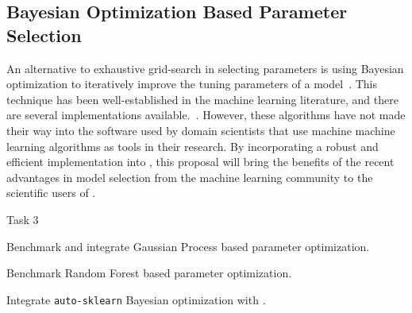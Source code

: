 \subsection{Bayesian Optimization Based Parameter Selection}
An alternative to exhaustive grid-search in selecting parameters is using
Bayesian optimization to iteratively improve the tuning parameters of a
model~\autocite{NIPS2011_4443, shahriari2016taking, NIPS2012_4522}.  This
technique has been well-established in the machine learning literature, and
there are several implementations available.~\autocite{bergstra2013hyperopt,
feurer-nips2015, komer2014hyperopt, snoek2015scalable}.  However, these
algorithms have not made their way into the software used by domain scientists
that use machine machine learning algorithms as tools in their research.
By incorporating a robust and efficient implementation into \sklearn{},
this proposal will bring the benefits of the recent advantages in model selection
from the machine learning community to the scientific users of \sklearn{}.
\begin{labeling}{Task 3}
    \item [Task 3] Benchmark and integrate Gaussian Process based parameter optimization.
    \item [Task 4] Benchmark Random Forest based parameter optimization.
    \item [Task 5] Integrate \texttt{auto-sklearn} Bayesian optimization with \sklearn{}.
\end{labeling}

